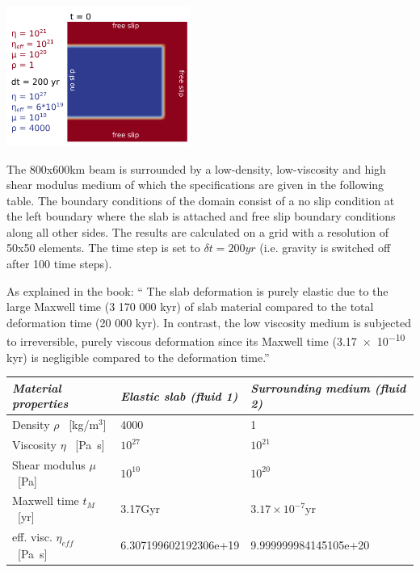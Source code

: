\begin{center}
\includegraphics[width=6cm]{python_codes/fieldstone_64/images/poster_benchmark.png}\\
\end{center}

The 800x600km beam is surrounded by a low-density, low-viscosity and high shear modulus medium 
of which the specifications are given in  the following table.
The boundary conditions of the domain consist of a no slip condition at  
the left boundary where the slab is attached and free slip boundary conditions along all other sides. 
The results are calculated on a grid with a resolution of 50x50 elements.
The time step is set to $\delta t = 200yr$ (i.e. gravity is switched off after 100 time steps).

As explained in the book: ``
The slab deformation is purely elastic due to the large Maxwell time (3 170 000 kyr) of slab material
compared to the total deformation time (20 000 kyr). In contrast, the low viscosity medium
is subjected to irreversible, purely viscous deformation since its Maxwell time (\num{3.17e-10} kyr) 
is negligible compared to the deformation time.''

\begin{center}
\begin{tabular}{lll}
\hline 
\textit{Material properties}& \textit{Elastic slab (fluid 1)}  & \textit{Surrounding medium (fluid 2)} \\
\hline 
\hline
Density         $\rho$ \  [kg/m$^{3}$]            & 4000                    & 1     \\
Viscosity       $\eta$ \  [\si{\pascal\second}]    & $10^{27}$               &   $10^{21}$     \\
Shear modulus   $\mu $ \  [\si{\pascal}]           & $10^{10}$               & $10^{20}$       \\
Maxwell time $t_M$     \  [yr]                     & 3.17Gyr                 &  $3.17\times10^{-7}$yr       \\
eff. visc.      $\eta_{eff}$ \ [\si{\pascal\second}] & 6.307199602192306e+19   &  9.999999984145105e+20      \\
\hline
\end{tabular}
\end{center}


